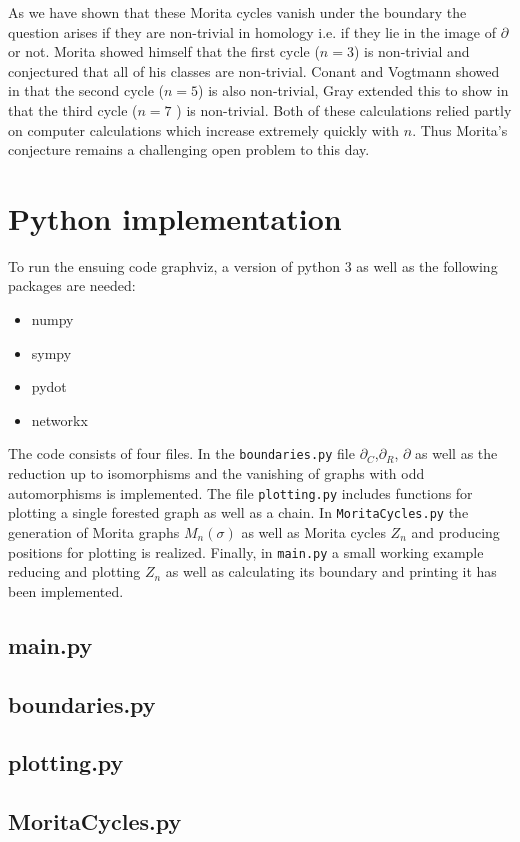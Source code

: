 As we have shown that these Morita cycles vanish under the boundary the question arises if they are
non-trivial in homology i.e. if they lie in the image of $\partial$ or not. 
Morita showed himself that the first cycle ($n=3$) is non-trivial and conjectured that 
all of his classes are non-trivial. Conant and Vogtmann showed in \cite{conant04} that 
the second cycle ($n=5$) is also non-trivial, Gray extended this
to show in \cite{gray11} that the third cycle ($n=7$ ) is non-trivial.
Both of these calculations relied partly on computer calculations
which increase extremely quickly with $n$. Thus Morita's conjecture
remains a challenging open problem to this day.

\newpage
\printbibliography
\newpage
\appendix
\section{Python implementation}
To run the ensuing code graphviz, a version of python 3 as well as the following packages are needed:
\begin{itemize}
	\item numpy
	\item sympy
	\item pydot
	\item networkx
\end{itemize}
The code consists of four files.
In the \texttt{boundaries.py} file $\partial_{C}$,$\partial_{R}$, $\partial$ as well as
the reduction up to isomorphisms and the vanishing of graphs with odd automorphisms is implemented.
The file \texttt{plotting.py} includes functions for plotting a single forested graph as well as a chain.
In \texttt{MoritaCycles.py} the generation of Morita graphs $M_{n}(\sigma)$ as well as
Morita cycles $Z_{n}$ and producing positions for plotting is realized.
Finally, in \texttt{main.py} a small working example reducing and plotting $Z_{n}$ as well as calculating
its boundary and printing it has been implemented.

\subsection{main.py}

\subsection{boundaries.py}

\subsection{plotting.py}

\subsection{MoritaCycles.py}


%


